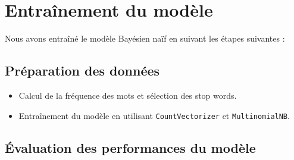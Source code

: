 \section{Entraînement du modèle}

Nous avons entraîné le modèle Bayésien naïf en suivant les étapes suivantes :

\subsection{Préparation des données}

\begin{itemize}
    \item Calcul de la fréquence des mots et sélection des stop words.
    \item Entraînement du modèle en utilisant \texttt{CountVectorizer} et \texttt{MultinomialNB}.
\end{itemize}

\subsection{Évaluation des performances du modèle}

